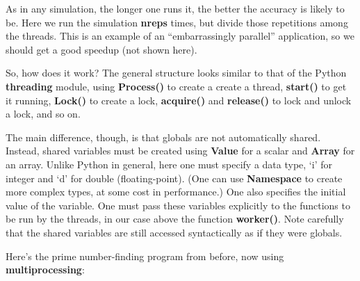 As in any simulation, the longer one runs it, the better the accuracy is
likely to be.  Here we run the simulation {\bf nreps} times, but divide
those repetitions among the threads.  This is an example of an
``embarrassingly parallel'' application, so we should get a good speedup
(not shown here).

So, how does it work?  The general structure looks similar to that of
the Python {\bf threading} module, using {\bf Process()} to create a create
a thread, {\bf start()} to get it running, {\bf Lock()} to create a
lock, {\bf acquire()} and {\bf release()} to lock and unlock a lock, and
so on.

The main difference, though, is that globals are not automatically
shared.  Instead, shared variables must be created using {\bf Value}
for a scalar and {\bf Array} for an array.  Unlike Python in general,
here one must specify a data type, `i' for integer and `d' for double
(floating-point).  (One can use {\bf Namespace} to create more complex
types, at some cost in performance.) One also specifies the initial
value of the variable.  One must pass these variables explicitly to the
functions to be run by the threads, in our case above the function {\bf
worker()}.  Note carefully that the shared variables are still accessed
syntactically as if they were globals.  

Here's the prime number-finding program from before, now using {\bf
multiprocessing}:

